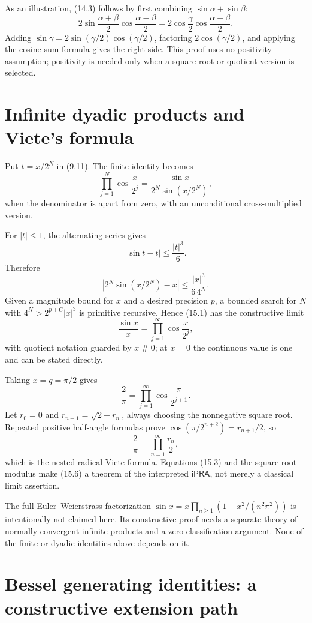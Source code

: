 \documentclass[11pt]{article}
\theoremstyle{definition}
\newcommand{\iPRA}{\mathsf{iPRA}}
\newcommand{\apart}{\mathrel{\#}}
\newcommand{\abs}[1]{\left|#1\right|}
\begin{document}
As an illustration, (14.3) follows by first combining \(\sin\alpha+\sin\beta\):
\[
 2\sin\frac{\alpha+\beta}{2}\cos\frac{\alpha-\beta}{2}
 =2\cos\frac\gamma2\cos\frac{\alpha-\beta}{2}.
\]
Adding \(\sin\gamma=2\sin(\gamma/2)\cos(\gamma/2)\), factoring
\(2\cos(\gamma/2)\), and applying the cosine sum formula gives the right side.
This proof uses no positivity assumption; positivity is needed only when a
square root or quotient version is selected.

\section{Infinite dyadic products and Viete's formula}
\label{sec:infinite}

Put \(t=x/2^N\) in (9.11).  The finite identity becomes
\[
 \prod_{j=1}^N\cos\frac{x}{2^j}
 =\frac{\sin x}{2^N\sin(x/2^N)},
 \tag{15.1}
\]
when the denominator is apart from zero, with an unconditional
cross-multiplied version.

For \(\abs t\le1\), the alternating series gives
\[
 \abs{\sin t-t}\le\frac{\abs t^3}{6}.
 \tag{15.2}
\]
Therefore
\[
 \abs{2^N\sin(x/2^N)-x}
 \le\frac{\abs x^3}{6\,4^N}.
 \tag{15.3}
\]
Given a magnitude bound for \(x\) and a desired precision \(p\), a bounded
search for \(N\) with \(4^N>2^{p+C}\abs x^3\) is primitive recursive.  Hence
(15.1) has the constructive limit
\[
 \frac{\sin x}{x}=\prod_{j=1}^\infty\cos\frac{x}{2^j},
 \tag{15.4}
\]
with quotient notation guarded by \(x\apart0\); at \(x=0\) the continuous value
is one and can be stated directly.

Taking \(x=q=\pi/2\) gives
\[
 \frac{2}{\pi}
 =\prod_{j=1}^\infty\cos\frac{\pi}{2^{j+1}}.
 \tag{15.5}
\]
Let \(r_0=0\) and \(r_{n+1}=\sqrt{2+r_n}\), always choosing the nonnegative
square root.  Repeated positive half-angle formulas prove
\(\cos(\pi/2^{n+2})=r_{n+1}/2\), so
\[
 \frac2\pi=\prod_{n=1}^\infty\frac{r_n}{2},
 \tag{15.6}
\]
which is the nested-radical Viete formula.  Equations (15.3) and the square-root
modulus make (15.6) a theorem of the interpreted \(\iPRA\), not merely a
classical limit assertion.

The full Euler--Weierstrass factorization
\(\sin x=x\prod_{n\ge1}(1-x^2/(n^2\pi^2))\) is intentionally not claimed here.
Its constructive proof needs a separate theory of normally convergent infinite
products and a zero-classification argument.  None of the finite or dyadic
identities above depends on it.

\section{Bessel generating identities: a constructive extension path}
\label{sec:bessel}
\end{document}

